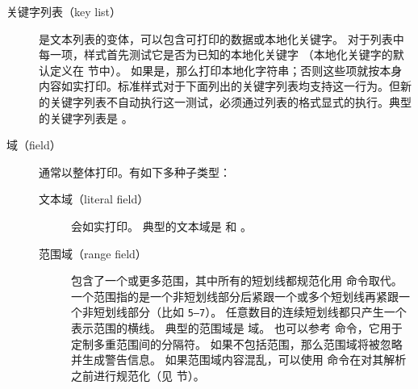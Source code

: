 \begin{description}
\begin{description}
\item[关键字列表（key list）]  是文本列表的变体，可以包含可打印的数据或本地化关键字。
对于列表中每一项，样式首先测试它是否为已知的本地化关键字
（本地化关键字的默认定义在  节中）。
如果是，那么打印本地化字符串；否则这些项就按本身内容如实打印。标准样式对于下面列出的关键字列表均支持这一行为。但新的关键字列表不自动执行这一测试，必须通过列表的格式显式的执行。典型的关键字列表是 。

\end{description}
\end{description}

\begin{description}

\item[域（field）] 通常以整体打印。有如下多种子类型：

\begin{description}

\item[文本域（literal field）]  会如实打印。
典型的文本域是  和 。


\item[范围域（range field）] 包含了一个或更多范围，其中所有的短划线都规范化用  命令取代。
一个范围指的是一个非短划线部分后紧跟一个或多个短划线再紧跟一个非短划线部分（比如 \texttt{5--7}）。
任意数目的连续短划线都只产生一个表示范围的横线。
典型的范围域是  域。
也可以参考  命令，它用于定制多重范围间的分隔符。
如果不包括范围，那么范围域将被忽略并生成警告信息。
如果范围域内容混乱，可以使用  命令在对其解析之前进行规范化（见  节）。


\end{description}
\end{description}
